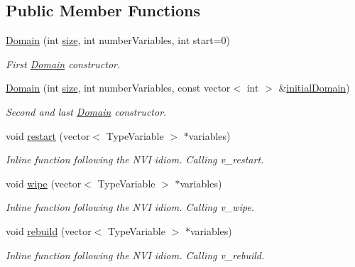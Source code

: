 \subsection*{Public Member Functions}
\begin{DoxyCompactItemize}
\item 
\hyperlink{classghost_1_1Domain_a8bf75e526b2ee95ccb32701175e3a43b}{Domain} (int \hyperlink{classghost_1_1Domain_a13e282f60c6c7cddf5b5716b45ad161c}{size}, int number\-Variables, int start=0)
\begin{DoxyCompactList}\small\item\em First \hyperlink{classghost_1_1Domain}{Domain} constructor. \end{DoxyCompactList}\item 
\hyperlink{classghost_1_1Domain_a26d7b928aa7a0bc44a47f2f407402ed7}{Domain} (int \hyperlink{classghost_1_1Domain_a13e282f60c6c7cddf5b5716b45ad161c}{size}, int number\-Variables, const vector$<$ int $>$ \&\hyperlink{classghost_1_1Domain_a8890ca1323c293a4a1e2aa1830eff043}{initial\-Domain})
\begin{DoxyCompactList}\small\item\em Second and last \hyperlink{classghost_1_1Domain}{Domain} constructor. \end{DoxyCompactList}\item 
void \hyperlink{classghost_1_1Domain_a253f06705e99ff88c9da7ed0ad6855aa}{restart} (vector$<$ Type\-Variable $>$ $\ast$variables)
\begin{DoxyCompactList}\small\item\em Inline function following the N\-V\-I idiom. Calling v\-\_\-restart. \end{DoxyCompactList}\item 
void \hyperlink{classghost_1_1Domain_ac26f73027a2b0abe86e5fef062ea177f}{wipe} (vector$<$ Type\-Variable $>$ $\ast$variables)
\begin{DoxyCompactList}\small\item\em Inline function following the N\-V\-I idiom. Calling v\-\_\-wipe. \end{DoxyCompactList}\item 
void \hyperlink{classghost_1_1Domain_a557b4c89eaf8503c27e873a7dcff838d}{rebuild} (vector$<$ Type\-Variable $>$ $\ast$variables)
\begin{DoxyCompactList}\small\item\em Inline function following the N\-V\-I idiom. Calling v\-\_\-rebuild. \end{DoxyCompactList}\item 

\end{DoxyCompactItemize}
